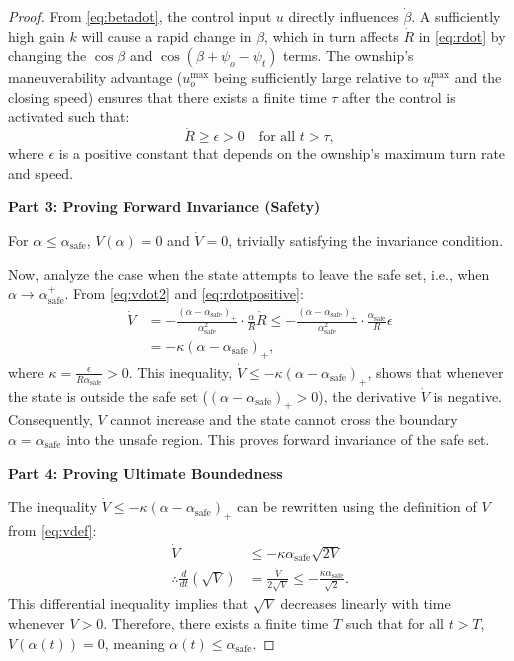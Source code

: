 \documentclass[10pt]{article}
\begin{document}
\begin{proof}
    From \eqref{eq:betadot}, the control input $u$ directly influences $\dot{\beta}$. A sufficiently high gain $k$ will cause a rapid change in $\beta$, which in turn affects $\dot{R}$ in \eqref{eq:rdot} by changing the $\cos\beta$ and $\cos(\beta + \psi_o - \psi_t)$ terms. The ownship's maneuverability advantage ($u_o^{\max}$ being sufficiently large relative to $u_t^{\max}$ and the closing speed) ensures that there exists a finite time $\tau$ after the control is activated such that:
    \begin{equation}\label{eq:rdotpositive}
        \dot{R} \geq \epsilon > 0 \quad \text{for all } t > \tau,
    \end{equation}
    where $\epsilon$ is a positive constant that depends on the ownship's maximum turn rate and speed.

    \textbf{Part 3: Proving Forward Invariance (Safety)}

    For $\alpha \leq \alpha_{\text{safe}}$, $V(\alpha) = 0$ and $\dot{V} = 0$, trivially satisfying the invariance condition.

    Now, analyze the case when the state attempts to leave the safe set, i.e., when $\alpha \to \alpha_{\text{safe}}^+$. From \eqref{eq:vdot2} and \eqref{eq:rdotpositive}:
    \begin{align*}
        \dot{V} &= -\frac{(\alpha - \alpha_{\text{safe}})_+}{\alpha_{\text{safe}}^2} \cdot \frac{\alpha}{R} \dot{R} \leq -\frac{(\alpha - \alpha_{\text{safe}})_+}{\alpha_{\text{safe}}^2} \cdot \frac{\alpha_{\text{safe}}}{R} \epsilon \\ 
                &= -\kappa (\alpha - \alpha_{\text{safe}})_+,
    \end{align*}
    where $\kappa = \frac{\epsilon}{R \alpha_{\text{safe}}} > 0$.
    This inequality, $\dot{V} \leq -\kappa (\alpha - \alpha_{\text{safe}})_+$, shows that whenever the state is outside the safe set ($(\alpha - \alpha_{\text{safe}})_+ > 0$), the derivative $\dot{V}$ is negative. Consequently, $V$ cannot increase and the state cannot cross the boundary $\alpha = \alpha_{\text{safe}}$ into the unsafe region. This proves forward invariance of the safe set.

    \textbf{Part 4: Proving Ultimate Boundedness}

    The inequality $\dot{V} \leq -\kappa (\alpha - \alpha_{\text{safe}})_+$ can be rewritten using the definition of $V$ from \eqref{eq:vdef}:
    \begin{align*}
        \dot{V} &\leq -\kappa \alpha_{\text{safe}} \sqrt{2V} \\
        \therefore \frac{d}{dt} \left( \sqrt{V} \right) &= \frac{\dot{V}}{2\sqrt{V}} \leq -\frac{\kappa \alpha_{\text{safe}}}{\sqrt{2}}.
    \end{align*}
    This differential inequality implies that $\sqrt{V}$ decreases linearly with time whenever $V > 0$. Therefore, there exists a finite time $T$ such that for all $t > T$, $V(\alpha(t)) = 0$, meaning $\alpha(t) \leq \alpha_{\text{safe}}$.


\end{proof}
\end{document}
